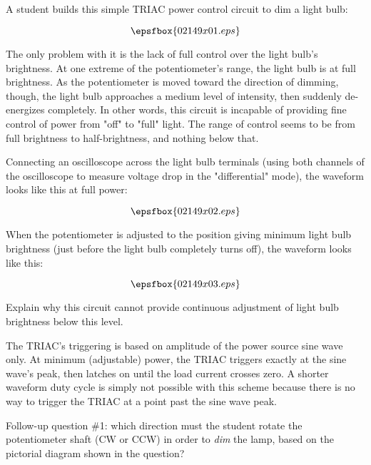 

A student builds this simple TRIAC power control circuit to dim a light bulb:

$$\epsfbox{02149x01.eps}$$

The only problem with it is the lack of full control over the light bulb's brightness.  At one extreme of the potentiometer's range, the light bulb is at full brightness.  As the potentiometer is moved toward the direction of dimming, though, the light bulb approaches a medium level of intensity, then suddenly de-energizes completely.  In other words, this circuit is incapable of providing fine control of power from "off" to "full" light.  The range of control seems to be from full brightness to half-brightness, and nothing below that.

Connecting an oscilloscope across the light bulb terminals (using both channels of the oscilloscope to measure voltage drop in the "differential" mode), the waveform looks like this at full power:

$$\epsfbox{02149x02.eps}$$

When the potentiometer is adjusted to the position giving minimum light bulb brightness (just before the light bulb completely turns off), the waveform looks like this:

$$\epsfbox{02149x03.eps}$$

Explain why this circuit cannot provide continuous adjustment of light bulb brightness below this level.







The TRIAC's triggering is based on amplitude of the power source sine wave only.  At minimum (adjustable) power, the TRIAC triggers exactly at the sine wave's peak, then latches on until the load current crosses zero.  A shorter waveform duty cycle is simply not possible with this scheme because there is no way to trigger the TRIAC at a point past the sine wave peak.

\vskip 10pt

Follow-up question \#1: which direction must the student rotate the potentiometer shaft (CW or CCW) in order to {\it dim} the lamp, based on the pictorial diagram shown in the question?

